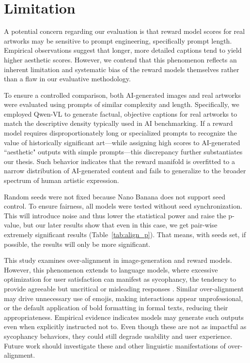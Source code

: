 \section{Limitation}

A potential concern regarding our evaluation is that reward model scores for real artworks may be sensitive to prompt engineering, specifically prompt length. Empirical observations suggest that longer, more detailed captions tend to yield higher aesthetic scores. However, we contend that this phenomenon reflects an inherent limitation and systematic bias of the reward models themselves rather than a flaw in our evaluative methodology. 

To ensure a controlled comparison, both AI-generated images and real artworks were evaluated using prompts of similar complexity and length. Specifically, we employed Qwen-VL to generate factual, objective captions for real artworks to match the descriptive density typically used in AI benchmarking. If a reward model requires disproportionately long or specialized prompts to recognize the value of historically significant art—while assigning high scores to AI-generated ``aesthetic" outputs with simple prompts—this discrepancy further substantiates our thesis. Such behavior indicates that the reward manifold is overfitted to a narrow distribution of AI-generated content and fails to generalize to the broader spectrum of human artistic expression.

Random seeds were not fixed because Nano Banana does not support seed control. To ensure fairness, all models were tested without seed synchronization. This will introduce noise and thus lower the statistical power and raise the p-value, but our later results show that even in this case, we get pair-wise extremely significant results (Table~\ref{tab:align_p}). That means, with seeds set, if possible, the results will only be more significant.


This study examines over-alignment in image-generation and reward models. However, this phenomenon extends to language models, where excessive optimization for user satisfaction can manifest as sycophancy, the tendency to provide agreeable but uncritical or misleading responses \cite{guo_position_2025, fitzgerald_introducing_2025, sharma_towards_2025, chen_yes-men_2025, arvin_check_2025}. Similar over-alignment may drive unnecessary use of emojis, making interactions appear unprofessional, or the default application of bold formatting in formal texts, reducing their appropriateness. Empirical evidence indicates models may generate such outputs even when explicitly instructed not to. Even though these are not as impactful as sycophancy behaviors, they could still degrade usability and user experience. Future work should investigate these and other linguistic manifestations of over-alignment.

